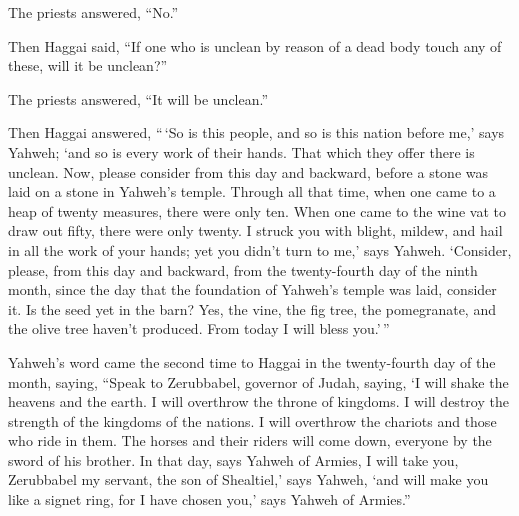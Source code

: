 The priests answered, ``No.''

 Then Haggai said, ``If one who is unclean by reason of a
dead body touch any of these, will it be unclean?''

The priests answered, ``It will be unclean.''

 Then Haggai answered, ``\,`So is this people, and so is
this nation before me,' says Yahweh; `and so is every work of their
hands. That which they offer there is unclean.  Now, please
consider from this day and backward, before a stone was laid on a stone
in Yahweh's temple.  Through all that time, when one came
to a heap of twenty measures, there were only ten. When one came to the
wine vat to draw out fifty, there were only twenty.  I
struck you with blight, mildew, and hail in all the work of your hands;
yet you didn't turn to me,' says Yahweh.  `Consider,
please, from this day and backward, from the twenty-fourth day of the
ninth month, since the day that the foundation of Yahweh's temple was
laid, consider it.  Is the seed yet in the barn? Yes, the
vine, the fig tree, the pomegranate, and the olive tree haven't
produced. From today I will bless you.'\,''

 Yahweh's word came the second time to Haggai in the
twenty-fourth day of the month, saying,  ``Speak to
Zerubbabel, governor of Judah, saying, `I will shake the heavens and the
earth.  I will overthrow the throne of kingdoms. I will
destroy the strength of the kingdoms of the nations. I will overthrow
the chariots and those who ride in them. The horses and their riders
will come down, everyone by the sword of his brother.  In
that day, says Yahweh of Armies, I will take you, Zerubbabel my servant,
the son of Shealtiel,' says Yahweh, `and will make you like a signet
ring, for I have chosen you,' says Yahweh of Armies.''
